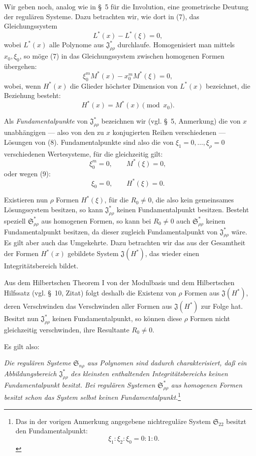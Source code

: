 \documentclass[11pt]{article}
\providecommand{\Ssys}{\mathfrak{S}}
\providecommand{\Jdom}{\mathfrak{J}}
\begin{document}
Wir geben noch, analog wie in \S\ 5 für die Involution, eine geometrische Deutung der regulären Systeme. Dazu betrachten wir, wie dort in (7), das Gleichungssystem
\begin{equation}
  L^*(x)-L^*(\xi)=0,
\tag{7}
\end{equation}
wobei $L^*(x)$ alle Polynome aus $\Jdom^*_{\rho\rho}$ durchlaufe. Homogenisiert man mittels $x_0,
\xi_0$, so möge (7) in das Gleichungssystem zwischen homogenen Formen übergehen:
\begin{equation}
  \xi_0^{m}M^*(x)-x_0^{m}M^*(\xi)=0,
\tag{8}
\end{equation}
wobei, wenn $H^*(x)$ die Glieder höchster Dimension von $L^*(x)$ bezeichnet, die Beziehung besteht:
\begin{equation}
  H^*(x)=M^*(x)\pmod{x_0}.
\tag{9}
\end{equation}

Als \emph{Fundamentalpunkte} von $\Jdom^*_{\rho\rho}$ bezeichnen wir (vgl. \S\ 5, Anmerkung) die von $x$ unabhängigen --- also von den zu $x$ konjugierten Reihen verschiedenen --- Lösungen von (8). Fundamentalpunkte sind also die von $\xi_1=0,
\ldots,
\xi_\rho=0$ verschiedenen Wertesysteme, für die gleichzeitig gilt:
\[
  \xi_0^m=0,\qquad M^*(\xi)=0,
\]
oder wegen (9):
\[
  \xi_0=0,
  \qquad H^*(\xi)=0.
\]

Existieren nun $\rho$ Formen $H^*(\xi)$, für die $R_0\ne0$, die also kein gemeinsames Lösungssystem besitzen, so kann $\Jdom^*_{\rho\rho}$ keinen Fundamentalpunkt besitzen. Besteht speziell $\Ssys^*_{\rho\rho}$ aus homogenen Formen, so kann bei $R_0\ne0$ auch $\Ssys^*_{\rho\rho}$ keinen Fundamentalpunkt besitzen, da dieser zugleich Fundamentalpunkt von $\Jdom^*_{\rho\rho}$ wäre. Es gilt aber auch das Umgekehrte. Dazu betrachten wir das aus der Gesamtheit der Formen $H^*(x)$ gebildete System $\Jdom(H^*)$, das wieder einen Integritätsbereich bildet.

Aus dem Hilbertschen Theorem I von der Modulbasis und dem Hilbertschen Hilfssatz (vgl. \S\ 10, Zitat) folgt deshalb die Existenz von $\rho$ Formen aus $\Jdom(H^*)$, deren Verschwinden das Verschwinden aller Formen aus $\Jdom(H^*)$ zur Folge hat. Besitzt nun $\Jdom^*_{\rho\rho}$ keinen Fundamentalpunkt, so können diese $\rho$ Formen nicht gleichzeitig verschwinden, ihre Resultante $R_0\ne0$.

Es gilt also:

\emph{Die regulären Systeme $\Ssys_{n\rho}$ aus Polynomen sind dadurch charakterisiert, daß ein Abbildungsbereich $\Jdom^*_{\rho\rho}$ des kleinsten enthaltenden Integritätsbereichs keinen Fundamentalpunkt besitzt. Bei regulären Systemen $\Ssys^*_{\rho\rho}$ aus homogenen Formen besitzt schon das System selbst keinen Fundamentalpunkt.}\footnote{Das in der vorigen Anmerkung angegebene nichtreguläre System $\Ssys_{22}$ besitzt den Fundamentalpunkt:
\[
  \xi_1:\xi_2:\xi_0=0:1:0.
\]}
\end{document}
